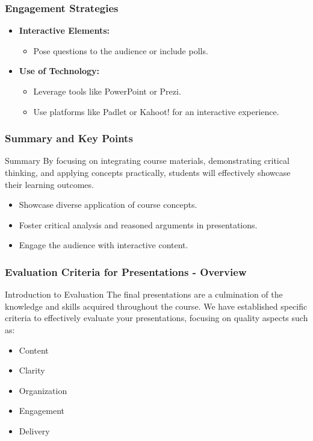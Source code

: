 \documentclass[aspectratio=169]{beamer}
\begin{document}
\begin{frame}[fragile]
    \frametitle{Engagement Strategies}
    \begin{itemize}
        \item \textbf{Interactive Elements:} 
        \begin{itemize}
            \item Pose questions to the audience or include polls.
        \end{itemize}
        \item \textbf{Use of Technology:} 
        \begin{itemize}
            \item Leverage tools like PowerPoint or Prezi.
            \item Use platforms like Padlet or Kahoot! for an interactive experience.
        \end{itemize}
    \end{itemize}
\end{frame}

\begin{frame}[fragile]
    \frametitle{Summary and Key Points}
    \begin{block}{Summary}
        By focusing on integrating course materials, demonstrating critical thinking, and applying concepts practically, students will effectively showcase their learning outcomes.
    \end{block}
    \begin{itemize}
        \item Showcase diverse application of course concepts.
        \item Foster critical analysis and reasoned arguments in presentations.
        \item Engage the audience with interactive content.
    \end{itemize}
\end{frame}

\begin{frame}[fragile]
    \frametitle{Evaluation Criteria for Presentations - Overview}
    \begin{block}{Introduction to Evaluation}
      The final presentations are a culmination of the knowledge and skills acquired throughout the course. 
      We have established specific criteria to effectively evaluate your presentations, focusing on quality aspects such as:
      \begin{itemize}
          \item Content
          \item Clarity
          \item Organization
          \item Engagement
          \item Delivery
      \end{itemize}
    \end{block}
\end{frame}
\end{document}
